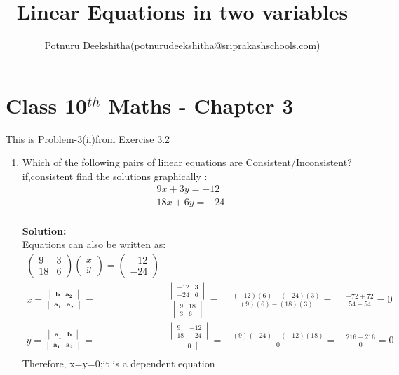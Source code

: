 \documentclass[12pt]{article}
\title{Linear Equations in two variables }
\author{Potnuru Deekshitha(potnurudeekshitha@sriprakashschools.com)}
\newcommand{\myvec}[1]{\ensuremath{\begin{pmatrix}#1\end{pmatrix}}}
\newcommand{\mydet}[1]{\ensuremath{\begin{vmatrix}#1\end{vmatrix}}}
\newcommand{\solution}{\noindent \textbf{Solution: }}
\let\vec\mathbf
\begin{document}
\maketitle
\section*{Class 10$^{th}$ Maths - Chapter 3}
This is Problem-3(ii)from Exercise 3.2
\begin{enumerate}
\item Which of the following pairs of linear equations are Consistent/Inconsistent?if,consistent find the solutions graphically :\\
\begin{align}
    9x+3y=-12\\
         18x+6y=-24 \\ 
\end{align}
      
\solution \\
            Equations  can also be written as:\\     
\begin{align}
\myvec{9&3\\18&6}\myvec{x\\y} = \myvec{-12\\-24}\\
x=\frac{\mydet{ \vec{b} & \vec{a_2}}}{\mydet{ \vec{a_1} &\vec{a_2} }} =&
\frac{\mydet{ -12 & 3 \\ -24 & 6 }}{\mydet{9&18\\3&6}} =&
\frac{(-12)(6)-(-24)(3)}{(9)(6)-(18)(3)} =&
\frac{-72+72}{54-54} = 0 \\
y=\frac{\mydet{\vec{a_1}&\vec{b}}}{\mydet{\vec{a_1}&\vec{a_2}}} =&
\frac{\mydet{9&-12\\18&-24}}{\mydet{0}} =&
\frac{(9)(-24)-(-12)(18)}{0} =&
\frac{216-216}{0} = 0\\
\end{align}
Therefore, x=y=0;it is a dependent equation

	

\end{enumerate}
\end{document}
